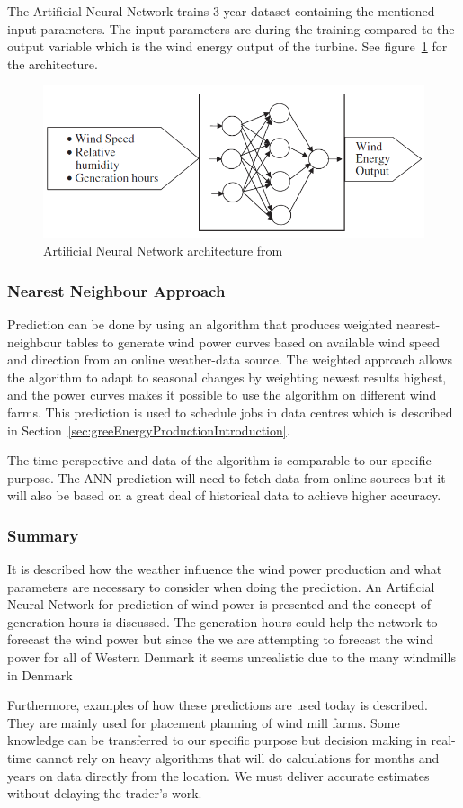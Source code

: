 The Artificial Neural Network trains 3-year dataset containing the mentioned input parameters. The input parameters are during the training compared to the output variable which is the wind energy output of the turbine. See figure~\ref{fig:annArchitecture} for the architecture.
\\[0.5cm]
\begin{figure}[h!]
\centering
\includegraphics[width=0.7\linewidth,natwidth=898,natheight=587]{billeder/ANNwindSpeedPrediction.png}
\caption{Artificial Neural Network architecture from \cite{WindPowerGenerationUsingANN}}
\label{fig:annArchitecture}
\end{figure}

\subsubsection{Nearest Neighbour Approach}
Prediction can be done by using an algorithm that produces weighted nearest-neighbour tables to generate wind power curves based on available wind speed and direction from an online weather-data source. The weighted approach allows the algorithm to adapt to seasonal changes by weighting newest results highest, and the power curves makes it possible to use the algorithm on different wind farms. This prediction is used to schedule jobs in data centres which is described in Section~\ref{sec:greeEnergyProductionIntroduction}.

The time perspective and data of the algorithm is comparable to our specific purpose. The ANN prediction will need to fetch data from online sources but it will also be based on a great deal of historical data to achieve higher accuracy. 

\subsubsection{Summary}
It is described how the weather influence the wind power production and what parameters are necessary to consider when doing the prediction. An Artificial Neural Network for prediction of wind power is presented and the concept of generation hours is discussed. The generation hours could help the network to forecast the wind power but since the we are attempting to forecast the wind power for all of Western Denmark it seems unrealistic due to the many windmills in Denmark 

Furthermore, examples of how these predictions are used today is described. They are mainly used for placement planning of wind mill farms. Some knowledge can be transferred to our specific purpose but decision making in real-time cannot rely on heavy algorithms that will do calculations for months and years on data directly from the location. We must deliver accurate estimates without delaying the trader's work. 
